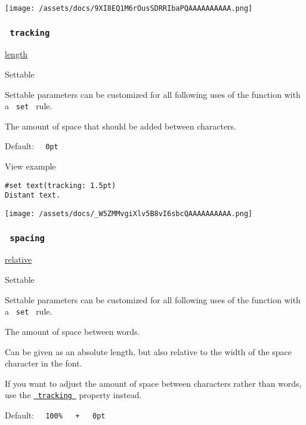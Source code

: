 \texttt{[image: /assets/docs/9XI8EQ1M6rOusSDRRIbaPQAAAAAAAAAA.png]}

\subsubsection{\texorpdfstring{\texttt{\ tracking\ }}{ tracking }}\label{parameters-tracking}

\href{/docs/reference/layout/length/}{length}

{{ Settable }}

\label{parameters-tracking-settable-tooltip}
Settable parameters can be customized for all following uses of the
function with a \texttt{\ set\ } rule.

The amount of space that should be added between characters.

Default: \texttt{\ }{\texttt{\ 0pt\ }}\texttt{\ }


View example

\begin{verbatim}
#set text(tracking: 1.5pt)
Distant text.
\end{verbatim}

\texttt{[image: /assets/docs/\_W5ZMMvgiXlv5B8vI6sbcQAAAAAAAAAA.png]}

\subsubsection{\texorpdfstring{\texttt{\ spacing\ }}{ spacing }}\label{parameters-spacing}

\href{/docs/reference/layout/relative/}{relative}

{{ Settable }}

\label{parameters-spacing-settable-tooltip}
Settable parameters can be customized for all following uses of the
function with a \texttt{\ set\ } rule.

The amount of space between words.

Can be given as an absolute length, but also relative to the width of
the space character in the font.

If you want to adjust the amount of space between characters rather than
words, use the
\href{/docs/reference/text/text/\#parameters-tracking}{\texttt{\ tracking\ }}
property instead.

Default:
\texttt{\ }{\texttt{\ 100\%\ }}\texttt{\ }{\texttt{\ +\ }}\texttt{\ }{\texttt{\ 0pt\ }}\texttt{\ }

